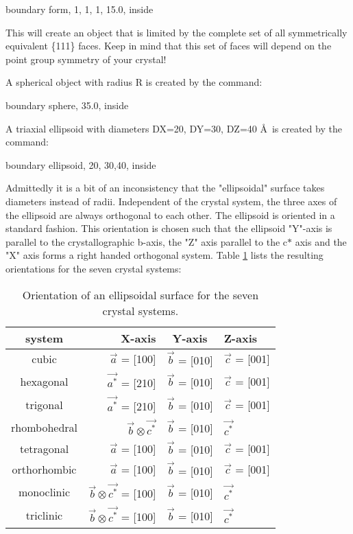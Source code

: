 \begin{MacVerbatim}
boundary form, 1, 1,  1, 15.0, inside
\end{MacVerbatim}

This will create an object that is limited by the complete set of
all symmetrically equivalent \{111\} faces. Keep in mind that this
set of faces will depend on the point group symmetry of your crystal!

A spherical object with radius R is created by the command:

\begin{MacVerbatim}
boundary sphere, 35.0, inside
\end{MacVerbatim}

A triaxial ellipsoid with diameters DX=20, DY=30, DZ=40 \AA\  is 
created by the command:

\begin{MacVerbatim}
boundary ellipsoid, 20, 30,40, inside
\end{MacVerbatim}

Admittedly it is a bit of an inconsistency that the "ellipsoidal" surface 
takes diameters instead of radii. Independent of the crystal system,
the three axes of the ellipsoid are always orthogonal to each other. 
The ellipsoid is oriented in a standard fashion. This orientation
is chosen such that the ellipsoid "Y"-axis is parallel to the 
crystallographic b-axis, the "Z" axis parallel to the c$*$ axis
and the "X" axis  forms a right handed orthogonal system. Table
\ref{mod-surf-tab1} lists the resulting orientations for the seven crystal systems:

\begin{table}[!tbh]
\centering
\begin{tabular}{|c|r|c|l|}
  \hline
  {\bf system} & {\bf X-axis} & {\bf Y-axis } & {\bf Z-axis} \\
  \hline\hline
  cubic        & {$\vec{a}$} = [100]                   & {$\vec{b}$} = [010]& {$\vec{c}$} = [001] \\
  hexagonal    & {$\vec{a^{*}}$} = [210]               & {$\vec{b}$} = [010]& {$\vec{c}$} = [001] \\
  trigonal     & {$\vec{a^{*}}$} = [210]               & {$\vec{b}$} = [010]& {$\vec{c}$} = [001] \\
  rhombohedral & {$\vec{b}\otimes\vec{c^{*}}$}         & {$\vec{b}$} = [010]& {$\vec{c^{*}}$}     \\
  tetragonal   & {$\vec{a}$} = [100]                   & {$\vec{b}$} = [010]& {$\vec{c}$} = [001] \\
  orthorhombic & {$\vec{a}$} = [100]                   & {$\vec{b}$} = [010]& {$\vec{c}$} = [001] \\
  monoclinic   & {$\vec{b}\otimes\vec{c^{*}}$} = [100] & {$\vec{b}$} = [010]& {$\vec{c^{*}}$}     \\
  triclinic    & {$\vec{b}\otimes\vec{c^{*}}$} = [100] & {$\vec{b}$} = [010]& {$\vec{c^{*}}$}     \\
  \hline
\end{tabular}
\caption{\label{mod-surf-tab1}Orientation of an ellipsoidal 
surface for the seven crystal systems.}
\end{table}

